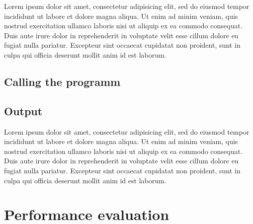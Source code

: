 


Lorem ipsum dolor sit amet, consectetur adipisicing elit, sed do eiusmod tempor incididunt ut labore et dolore magna aliqua. Ut enim ad minim veniam, quis nostrud exercitation ullamco laboris nisi ut aliquip ex ea commodo consequat. Duis aute irure dolor in reprehenderit in voluptate velit esse cillum dolore eu fugiat nulla pariatur. Excepteur sint occaecat cupidatat non proident, sunt in culpa qui officia deserunt mollit anim id est laborum.

\subsection{Calling the programm}

\subsection{Output}


Lorem ipsum dolor sit amet, consectetur adipisicing elit, sed do eiusmod tempor incididunt ut labore et dolore magna aliqua. Ut enim ad minim veniam, quis nostrud exercitation ullamco laboris nisi ut aliquip ex ea commodo consequat. Duis aute irure dolor in reprehenderit in voluptate velit esse cillum dolore eu fugiat nulla pariatur. Excepteur sint occaecat cupidatat non proident, sunt in culpa qui officia deserunt mollit anim id est laborum.

\section{Performance evaluation}








